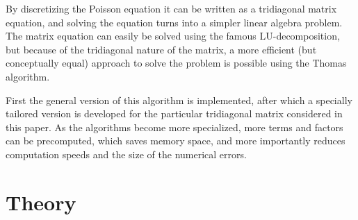 \documentclass[aps,reprint]{revtex4-1}
\begin{document}
By discretizing the Poisson equation it can be written as
a tridiagonal matrix equation, and solving the equation turns into a simpler
linear algebra problem. The matrix equation can easily be solved using the
famous LU-decomposition, but because of the tridiagonal nature of the matrix,
a more efficient (but conceptually equal) approach to solve the problem is
possible using the Thomas algorithm.

First the general version of this algorithm is implemented, after which a
specially tailored version is developed for the particular tridiagonal matrix
considered in this paper. As the algorithms become more specialized, more
terms and factors can be precomputed, which saves memory space, and more importantly
reduces computation speeds and the size of the numerical errors.

\section{Theory}
\end{document}
